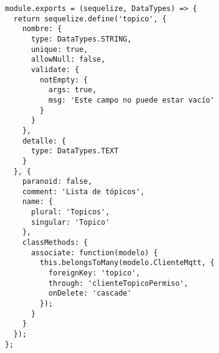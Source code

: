 \begin{lstlisting}[label=anx:modelo_topico]
module.exports = (sequelize, DataTypes) => {
  return sequelize.define('topico', {
    nombre: {
      type: DataTypes.STRING,
      unique: true,
      allowNull: false,
      validate: {
        notEmpty: {
          args: true,
          msg: 'Este campo no puede estar vacío'
        }
      }
    },
    detalle: {
      type: DataTypes.TEXT
    }
  }, {
    paranoid: false,
    comment: 'Lista de tópicos',
    name: {
      plural: 'Topicos',
      singular: 'Topico'
    },
    classMethods: {
      associate: function(modelo) {
        this.belongsToMany(modelo.ClienteMqtt, {
          foreignKey: 'topico',
          through: 'clienteTopicoPermiso',
          onDelete: 'cascade'
        });
      }
    }
  });
};
\end{lstlisting}